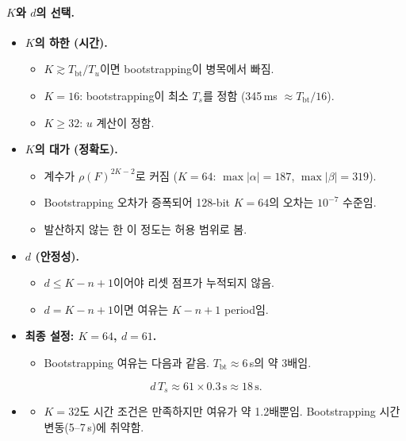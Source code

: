 \documentclass[11pt,a4paper]{article}
\begin{document}
\paragraph{$K$와 $d$의 선택.}
\begin{itemize}
\item \textbf{$K$의 하한 (시간).}
  \begin{itemize}
  \item $K\gtrsim T_{\mathrm{bt}}/T_u$이면 bootstrapping이 병목에서 빠짐.
  \item $K=16$: bootstrapping이 최소 $T_s$를 정함 (345\,ms $\approx T_{\mathrm{bt}}/16$).
  \item $K\ge32$: $u$ 계산이 정함.
  \end{itemize}
\item \textbf{$K$의 대가 (정확도).}
  \begin{itemize}
  \item 계수가 $\rho(F)^{2K-2}$로 커짐 ($K=64$: $\max|\alpha|=187$, $\max|\beta|=319$).
  \item Bootstrapping 오차가 증폭되어 128-bit $K=64$의 오차는 $10^{-7}$ 수준임.
  \item 발산하지 않는 한 이 정도는 허용 범위로 봄.
  \end{itemize}
\item \textbf{$d$ (안정성).}
  \begin{itemize}
  \item $d\le K-n+1$이어야 리셋 점프가 누적되지 않음.
  \item $d=K-n+1$이면 여유는 $K-n+1$ period임.
  \end{itemize}
\item \textbf{최종 설정: $K=64$, $d=61$.}
  \begin{itemize}
  \item Bootstrapping 여유는 다음과 같음. $T_{\mathrm{bt}}\approx6$\,s의 약 3배임.
  \end{itemize}
\end{itemize}
\begin{equation}
d\,T_s\approx61\times0.3\,\mathrm{s}\approx18\,\mathrm{s}.
\end{equation}
\begin{itemize}
\item[]
  \begin{itemize}
  \item $K=32$도 시간 조건은 만족하지만 여유가 약 1.2배뿐임. Bootstrapping 시간 변동(5--7\,s)에 취약함.
  \end{itemize}
\end{itemize}
\end{document}

